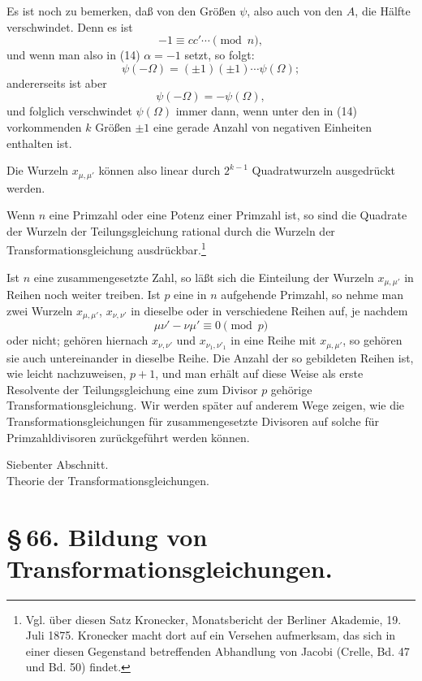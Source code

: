 \documentclass[11pt]{article}
\begin{document}
Es ist noch zu bemerken, daß von den Größen $\psi$, also auch von den $A$, die Hälfte
verschwindet. Denn es ist
\[
 -1\equiv cc'\cdots\pmod n,
\]
und wenn man also in (14) $\alpha=-1$ setzt, so folgt:
\[
 \psi(-\Omega)=(\pm1)(\pm1)\cdots\psi(\Omega);
\]
andererseits ist aber
\[
 \psi(-\Omega)=-\psi(\Omega),
\]
und folglich verschwindet $\psi(\Omega)$ immer dann, wenn unter den in (14) vorkommenden
$k$ Größen $\pm1$ eine gerade Anzahl von negativen Einheiten enthalten ist.

Die Wurzeln $x_{\mu,\mu'}$ können also linear durch $2^{k-1}$ Quadratwurzeln ausgedrückt
werden.

Wenn $n$ eine Primzahl oder eine Potenz einer Primzahl ist, so sind die Quadrate der
Wurzeln der Teilungsgleichung rational durch die Wurzeln der Transformationsgleichung
ausdrückbar.\footnote{Vgl. über diesen Satz Kronecker, Monatsbericht der Berliner Akademie, 19. Juli 1875. Kronecker macht dort auf ein Versehen aufmerksam, das sich in einer diesen Gegenstand betreffenden Abhandlung von Jacobi (Crelle, Bd. 47 und Bd. 50) findet.}

Ist $n$ eine zusammengesetzte Zahl, so läßt sich die Einteilung der Wurzeln
$x_{\mu,\mu'}$ in Reihen noch weiter treiben. Ist $p$ eine in $n$ aufgehende Primzahl, so
nehme man zwei Wurzeln $x_{\mu,\mu'}$, $x_{\nu,\nu'}$ in dieselbe oder in verschiedene Reihen
auf, je nachdem
\[
 \mu\nu'-\nu\mu'\equiv0\pmod p
\]
oder nicht; gehören hiernach $x_{\nu,\nu'}$ und $x_{\nu_1,\nu'_1}$ in eine Reihe mit
$x_{\mu,\mu'}$, so gehören sie auch untereinander in dieselbe Reihe. Die Anzahl der so
gebildeten Reihen ist, wie leicht nachzuweisen, $p+1$, und man erhält auf diese Weise als
erste Resolvente der Teilungsgleichung eine zum Divisor $p$ gehörige Transformationsgleichung.
Wir werden später auf anderem Wege zeigen, wie die Transformationsgleichungen für
zusammengesetzte Divisoren auf solche für Primzahldivisoren zurückgeführt werden können.


\begin{center}
{\large Siebenter Abschnitt.}\\[0.7em]
{\Large Theorie der Transformationsgleichungen.}
\end{center}

\section*{\S\,66. Bildung von Transformationsgleichungen.}
\end{document}

